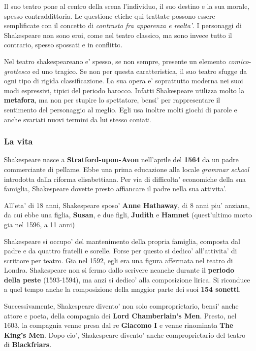 \documentclass{article}
\begin{document}
{{    Il suo teatro pone al centro della scena l'individuo, il suo destino e la sua morale, spesso contraddittoria. Le questione etiche qui trattate possono essere semplificate con il concetto di \textit{contrasto fra apparenza e realta'}. I personaggi di Shakespeare non sono eroi, come nel teatro classico, ma sono invece tutto il contrario, spesso spossati e in conflitto.

    Nel teatro shakespeareano e' spesso, se non sempre, presente un elemento \textit{comico-grottesco} ed uno tragico. Se non per questa caratteristica, il suo teatro sfugge da ogni tipo di rigida classificazione. La sua opera e' soprattutto moderna nei suoi modi espressivi, tipici del periodo barocco. Infatti Shakespeare utilizza molto la \textbf{metafora}, ma non per stupire lo spettatore, bensi' per rappresentare il sentimento del personaggio al meglio. Egli usa inoltre molti giochi di parole e anche svariati nuovi termini da lui stesso coniati.

    \subsubsection{La vita}
    Shakespeare nasce a \textbf{Stratford-upon-Avon} nell'aprile del \textbf{1564} da un padre commerciante di pellame. Ebbe una prima educazione alla locale \textit{grammar school} introdotta dalla riforma elisabettiana. Per via di difficolta' economiche della sua famiglia, Shakespeare dovette presto affiancare il padre nella sua attivita'.

    All'eta' di 18 anni, Shakespeare sposo' \textbf{Anne Hathaway}, di 8 anni piu' anziana, da cui ebbe una figlia, \textbf{Susan}, e due figli, \textbf{Judith} e \textbf{Hamnet} \small{(quest'ultimo morto gia nel 1596, a 11 anni)}

    Shakespeare si occupo' del mantenimento della propria famiglia, composta dal padre e da quattro fratelli e sorelle. Forse per questo si dedico' all'attivita' di scrittore per teatro. Gia nel 1592, egli era una figura affermata nel teatro di Londra. Shakespeare non si fermo dallo scrivere neanche durante il \textbf{periodo della peste} \small{(1593-1594)}, ma anzi si dedico' alla composizione lirica. Si riconduce a quel tempo anche la composizione della maggior parte dei suoi \textbf{154 sonetti}.

    Successivamente, Shakespeare divento' non solo comproprietario, bensi' anche attore e poeta, della compagnia dei \textbf{Lord Chamberlain's Men}. Presto, nel 1603, la compagnia venne presa dal re \textbf{Giacomo I} e venne rinominata \textbf{The King's Men}. Dopo cio', Shakespeare divento' anche comproprietario del teatro di \textbf{Blackfriars}.

}}
\end{document}
